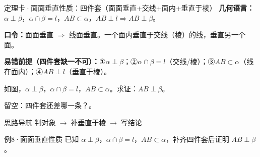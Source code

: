 \documentclass{exam-zh}
\begin{document}
\begin{eduSolutionBox}{定理卡·面面垂直性质：四件套（面面垂直+交线+面内+垂直于棱）}
  \begingroup
  \setlength{\parskip}{2.5mm}
\textbf{几何语言：}$\alpha\perp\beta$，$\alpha\cap\beta=l$，$AB\subset\alpha$，$AB\perp l\Rightarrow AB\perp\beta$。\par
\textbf{口令：}面面垂直 $\Rightarrow$ 线面垂直。一个面内垂直于交线（棱）的线，垂直另一个面。\par
\textbf{易错前提（四件套缺一不可）：}①$\alpha\perp\beta$；②$\alpha\cap\beta=l$（交线/棱）；③$AB\subset\alpha$（线在面内）；④$AB\perp l$（垂直于棱）。\par
  \endgroup
\end{eduSolutionBox}




\begin{eduProblemBlock}[例8·面面垂直性质]
\noindent
\begin{minipage}[t]{\dimexpr\linewidth-70mm-6mm\relax}
\vspace{0pt}
如图，$\alpha\perp\beta$，$\alpha\cap\beta=l$，$AB\subset\alpha$。求证：$AB\perp\beta$。
\par\noindent 留空：四件套还差哪一条？\underline{\hspace{20mm}}。

\end{minipage}\hfill
\begin{diagramcoltikz}{70mm}{平面 α⊥β 交于 l，AB 在 α 内。}
}
\end{diagramcoltikz}
\end{eduProblemBlock}





\begin{eduAuxItem}{思路导航}
判对象$\;\to\;$补垂直于棱$\;\to\;$写结论\end{eduAuxItem}




\begin{eduSubQuestionItem}{例8·面面垂直性质}
已知 $\alpha\perp\beta$，$\alpha\cap\beta=l$，$AB\subset\alpha$，补齐四件套后证明 $AB\perp\beta$。\end{eduSubQuestionItem}
\end{document}
